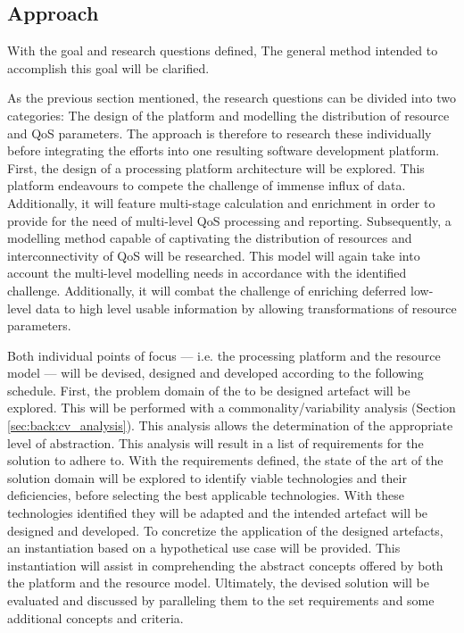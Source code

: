 \subsection{Approach}
With the goal and research questions defined, The general method intended to accomplish this goal will be clarified.

As the previous section mentioned, the research questions can be divided into two categories: The design of the platform and modelling the distribution of resource and QoS parameters. The approach is therefore to research these individually before integrating the efforts into one resulting software development platform. First, the design of a processing platform architecture will be explored. This platform endeavours to compete the challenge of immense influx of data. Additionally, it will feature multi-stage calculation and enrichment in order to provide for the need of multi-level QoS processing and reporting. Subsequently, a modelling method capable of captivating the distribution of resources and interconnectivity of QoS will be researched. This model will again take into account the multi-level modelling needs in accordance with the identified challenge. Additionally, it will combat the challenge of enriching deferred low-level data to high level usable information by allowing transformations of resource parameters.

Both individual points of focus --- i.e. the processing platform and the resource model --- will be devised, designed and developed according to the following schedule. First, the problem domain of the to be designed artefact will be explored. This will be performed with a commonality/variability analysis (Section \ref{sec:back:cv_analysis}). This analysis allows the determination of the appropriate level of abstraction. This analysis will result in a list of requirements for the solution to adhere to. With the requirements defined, the state of the art of the solution domain will be explored to identify viable technologies and their deficiencies, before selecting the best applicable technologies. With these technologies identified they will be adapted and the intended artefact will be designed and developed. To concretize the application of the designed artefacts, an instantiation based on a hypothetical use case will be provided. This instantiation will assist in comprehending the abstract concepts offered by both the platform and the resource model. Ultimately, the devised solution will be evaluated and discussed by paralleling them to the set requirements and some additional concepts and criteria.

